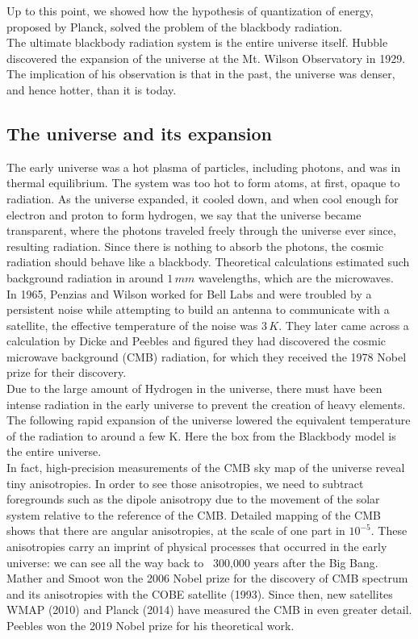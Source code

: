\documentclass[11pt]{article}
\theoremstyle{break}
\theoremstyle{break}
\begin{document}
Up to this point, we showed how the hypothesis of quantization of energy, proposed by Planck, solved the problem of the blackbody radiation. \\


The ultimate blackbody radiation system is the entire universe itself. Hubble discovered the expansion of the universe at the Mt. Wilson Observatory in 1929. The implication of his observation is that in the past, the universe was denser, and hence hotter, than it is today. \\

\subsection{The universe and its expansion}
The early universe was a hot plasma of particles, including photons, and was in thermal equilibrium. The system was too hot to form atoms, at first, opaque to radiation. As the universe expanded, it cooled down, and when cool enough for electron and proton to form hydrogen, we say that the universe became transparent, where the photons traveled freely through the universe ever since, resulting radiation. Since there is nothing to absorb the photons, the cosmic radiation should behave like a blackbody. Theoretical calculations estimated such background radiation in around $1\, mm$ wavelengths, which are the microwaves. \\

In 1965, Penzias and Wilson worked for Bell Labs and were troubled by a persistent noise while attempting to build an antenna to communicate with a satellite, the effective temperature of the noise was $3\,K$. They later came across a calculation by Dicke and Peebles and figured they had discovered the cosmic microwave background (CMB) radiation, for which they received the 1978 Nobel prize for their discovery.\\


Due to the large amount of Hydrogen in the universe, there must have been intense radiation in the early universe to prevent the creation of heavy elements.
The following rapid expansion of the universe lowered the equivalent temperature of the radiation to around a few K. Here the box from the Blackbody model is the entire universe.\\

In fact, high-precision measurements of the CMB sky map of the universe reveal tiny anisotropies. In order to see those anisotropies, we need to subtract foregrounds such as the dipole anisotropy due to the movement of the solar system relative to the reference of the CMB. Detailed mapping of the CMB shows that there are angular anisotropies, at the scale of one part in $10^{-5}$. These anisotropies carry an imprint of physical processes that occurred in the early universe: we can see all the way back to ~300,000 years after the Big Bang. Mather and Smoot won the 2006 Nobel prize for the discovery of CMB spectrum and its anisotropies with the COBE satellite (1993). Since then, new satellites WMAP (2010) and Planck (2014) have measured the CMB in even greater detail. Peebles won the 2019 Nobel prize for his theoretical work.\\
\newpage
\end{document}
